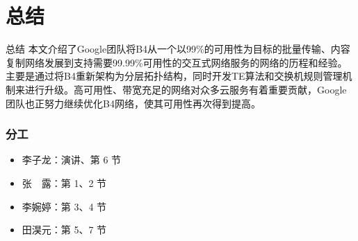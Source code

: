 \section{总结}
\begin{frame}{总结}
    本文介绍了Google团队将B4从一个以\alert{99\%}的可用性为目标的批量传输、内容复制网络发展到支持需要\alert{99.99\%}可用性的交互式网络服务的网络的历程和经验。主要是通过将B4重新架构为分层拓扑结构，同时开发TE算法和交换机规则管理机制来进行升级。高可用性、带宽充足的网络对众多云服务有着重要贡献，Google团队也正努力继续优化B4网络，使其可用性再次得到提高。
\end{frame}

\begin{frame}[plain]
    \frametitle{分工}
    \begin{itemize}
        \item 李子龙：演讲、第 6 节
        \item 张　露：第 1、2 节
        \item 李婉婷：第 3、4 节
        \item 田淏元：第 5、7 节
    \end{itemize}
\end{frame}

\makebottom[min]
